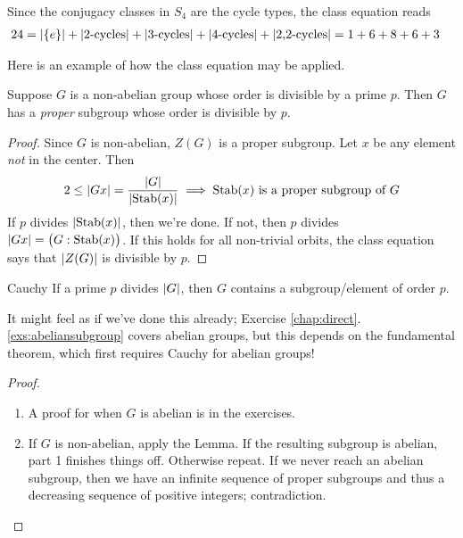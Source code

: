 \begin{example}{}{}
Since the conjugacy classes in $S_4$ are the cycle types, the class equation reads
\begin{align*}
24&=\nm{\{e\}} +\nm{\text{2-cycles}} +\nm{\text{3-cycles}} +\nm{\text{4-cycles}} +\nm{\text{2,2-cycles}} %
=1+6+8+6+3
\end{align*}
\end{example}

Here is an example of how the class equation may be applied.

\begin{lemm}{}{}
Suppose $G$ is a non-abelian group whose order is divisible by a prime $p$. Then $G$ has a \emph{proper} subgroup whose order is divisible by $p$.
\end{lemm}

\begin{proof}
Since $G$ is non-abelian, $Z(G)$ is a proper subgroup. Let $x$ be any element \emph{not} in the center. Then
	\[2\le \left| Gx\right|=\frac{\left| G\right|}{\left| \operatorname{Stab}(x)\right|} \implies \operatorname{Stab}(x)\text{ is a proper subgroup of }G\]
	If $p$ divides $\left| \operatorname{Stab}(x)\right|$, then we're done. If not, then $p$ divides $\left| Gx\right|=\bigl(G:\operatorname{Stab}(x)\bigr)$. If this holds for all non-trivial orbits, the class equation says that $\left| Z(G)\right|$ is divisible by $p$.
\end{proof}


\begin{thm}{Cauchy}{}
If a prime $p$ divides $\left| G\right|$, then $G$ contains a subgroup/element of order $p$. 
\end{thm}


It might feel as if we've done this already; Exercise \ref*{chap:direct}.\ref{exs:abeliansubgroup} covers abelian groups, but this depends on the fundamental theorem, which first requires Cauchy for abelian groups! 



\begin{proof}
\begin{enumerate}
  \item A proof for when $G$ is abelian is in the exercises.
  \item If $G$ is non-abelian, apply the Lemma. If the resulting subgroup is abelian, part 1 finishes things off. Otherwise repeat. If we never reach an abelian subgroup, then we have an infinite sequence of proper subgroups and thus a decreasing sequence of positive integers; contradiction.\qedhere
\end{enumerate}
\end{proof}

